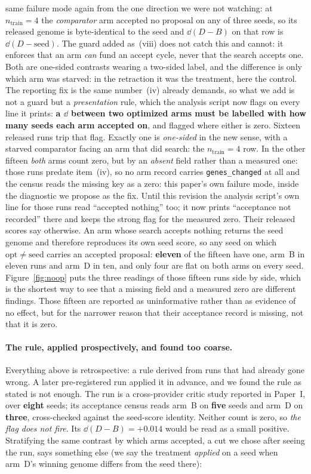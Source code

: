 \documentclass[11pt]{article}
\begin{document}
same failure mode again from the one direction we were not watching: at
$n_{\mathrm{train}}{=}4$ the \emph{comparator} arm accepted no proposal on any of three seeds,
so its released genome is byte-identical to the seed and $\dd(D-B)$ on that row is
$\dd(D-\mathrm{seed})$. The guard added as~(viii) does not catch this and cannot: it enforces
that an arm \emph{can} fund an accept cycle, never that the search accepts one. Both are
one-sided contrasts wearing a two-sided label, and the difference is only which arm was
starved: in the retraction it was the treatment, here the control. The reporting fix is the
same number~(iv) already demands, so what we add is not a guard but a \emph{presentation} rule,
which the analysis script now flags on every line it prints: \textbf{a $\dd$ between two optimized arms must be
labelled with how many seeds each arm accepted on}, and flagged where either is zero.
Sixteen released runs trip that flag. Exactly one is \emph{one-sided} in the new sense, with a
starved comparator facing an arm that did search: the $n_{\mathrm{train}}{=}4$ row. In the other
fifteen \emph{both} arms count zero, but by an \emph{absent} field rather than a measured one:
those runs predate item~(iv), so no arm record carries \texttt{genes\_changed} at all and the
census reads the missing key as a zero: this paper's own failure mode, inside the diagnostic we
propose as the fix. Until this revision the analysis script's own line for those runs read
``accepted nothing'' too; it now prints ``acceptance not recorded'' there and keeps the strong
flag for the measured zero. Their released scores say otherwise. An arm whose search accepts nothing
returns the seed genome and therefore reproduces its own seed score, so any seed on which
$\mathrm{opt} \ne \mathrm{seed}$ carries an accepted proposal: \textbf{eleven} of the fifteen
have one, arm~B in eleven runs and arm~D in ten, and only four are flat on both arms on every
seed. Figure~\ref{fig:noop} puts the three readings of those fifteen runs side by side, which is
the shortest way to see that a missing field and a measured zero are different findings.
Those fifteen are reported as uninformative rather than as evidence
of no effect, but for the narrower reason that their acceptance record is missing, not that it
is zero.

\paragraph{The rule, applied prospectively, and found too coarse.}
Everything above is retrospective: a rule derived from runs that had already gone wrong. A later
pre-registered run applied it in advance, and we found the rule as stated is not
enough. The run is a cross-provider critic study reported in Paper~I, over \textbf{eight} seeds; its
acceptance census reads arm~B on \textbf{five} seeds and arm~D on \textbf{three}, cross-checked
against the seed-score identity. Neither count is zero, so \emph{the flag does not fire}. Its
$\dd(D-B) = +0.014$ would be read as a small positive.
Stratifying the same contrast by which arms accepted, a cut we chose after seeing the run, says
something else (we say the treatment \emph{applied} on a seed when arm~D's winning genome differs
from the seed there):
\end{document}
